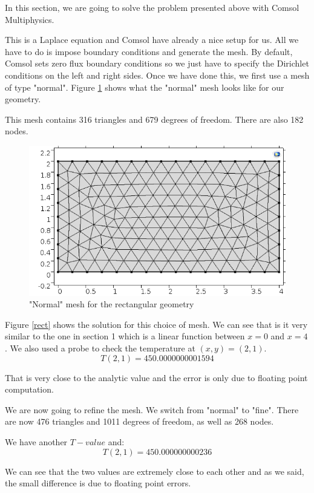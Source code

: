 In this section, we are going to solve the problem presented above with Comsol Multiphysics.

This is a Laplace equation and Comsol have already a nice setup for us. All we have to do is impose boundary conditions and generate the mesh. By default, Comsol sets zero flux boundary conditions so we just have to specify the Dirichlet conditions on the left and right sides. Once we have done this, we first use a mesh of type "normal". Figure \ref{mesh} shows what the "normal" mesh looks like for our geometry.

This mesh contains 316 triangles and 679 degrees of freedom. There are also 182 nodes.

\begin{figure}
\begin{center}
\includegraphics[scale=0.6]{laplaceMesh.png}
\caption{"Normal" mesh for the rectangular geometry}
\label{mesh}
\end{center}
\end{figure}

Figure \ref{rect} shows the solution for this choice of mesh. We can see that is it very similar to the one in section 1 which is a linear function between $x=0$ and $x=4$. We also used a probe to check the temperature at $(x,y)=(2,1)$.
$$T(2,1) = 450.0000000001594$$

That is very close to the analytic value and the error is only due to floating point computation.

We are now going to refine the mesh. We switch from "normal" to "fine". There are now 476 triangles and 1011 degrees of freedom, as well as 268 nodes.

We have another $T-value$ and:
$$T(2,1) = 450.000000000236$$

We can see that the two values are extremely close to each other and as we said, the small difference is due to floating point errors.

